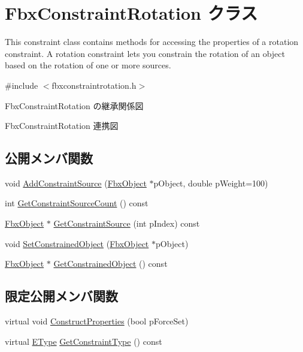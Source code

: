 \hypertarget{class_fbx_constraint_rotation}{}\section{Fbx\+Constraint\+Rotation クラス}
\label{class_fbx_constraint_rotation}


This constraint class contains methods for accessing the properties of a rotation constraint. A rotation constraint lets you constrain the rotation of an object based on the rotation of one or more sources.  




{\ttfamily \#include $<$fbxconstraintrotation.\+h$>$}



Fbx\+Constraint\+Rotation の継承関係図


Fbx\+Constraint\+Rotation 連携図
\subsection*{公開メンバ関数}
\begin{DoxyCompactItemize}
\item 
void \hyperlink{class_fbx_constraint_rotation_ac025636c53dc8316f7da590de99bdb20}{Add\+Constraint\+Source} (\hyperlink{class_fbx_object}{Fbx\+Object} $\ast$p\+Object, double p\+Weight=100)
\item 
int \hyperlink{class_fbx_constraint_rotation_ab27178d5b53654eb9f41f6e3f3a4c5dc}{Get\+Constraint\+Source\+Count} () const
\item 
\hyperlink{class_fbx_object}{Fbx\+Object} $\ast$ \hyperlink{class_fbx_constraint_rotation_a4bfb008520cb5aa6996104c292e5819e}{Get\+Constraint\+Source} (int p\+Index) const
\item 
void \hyperlink{class_fbx_constraint_rotation_ae7d40f146877a4defd18cd41692fa78e}{Set\+Constrained\+Object} (\hyperlink{class_fbx_object}{Fbx\+Object} $\ast$p\+Object)
\item 
\hyperlink{class_fbx_object}{Fbx\+Object} $\ast$ \hyperlink{class_fbx_constraint_rotation_ad9bdaf083716c730fdd907a9387e4991}{Get\+Constrained\+Object} () const
\end{DoxyCompactItemize}
\subsection*{限定公開メンバ関数}
\begin{DoxyCompactItemize}
\item 
virtual void \hyperlink{class_fbx_constraint_rotation_ad9f6469905777a18e3a383f402bdd9b0}{Construct\+Properties} (bool p\+Force\+Set)
\item 
virtual \hyperlink{class_fbx_constraint_a49c1634663395eab7c28856df233ec66}{E\+Type} \hyperlink{class_fbx_constraint_rotation_a8d9f54ac347d18a0871eafc21e88cb77}{Get\+Constraint\+Type} () const
\end{DoxyCompactItemize}
